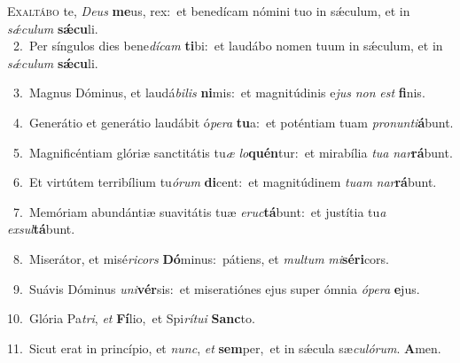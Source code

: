 \lettrine{\initial\textcolor{\initialcolor}{E}}{xaltábo} te, \textit{De}\-\textit{us} \textbf{me}\-us, rex:~\star et benedícam nómini tuo in sǽculum, et in \textit{sǽ}\-\textit{cu}\textit{lum} \textbf{sǽ}\-\textbf{cu}li.\\
{\numbfont\textcolor{\numbcolor}{~2.}}~Per síngulos dies bene\-\textit{dí}\-\textit{cam} \textbf{ti}\-bi:~\star et laudábo nomen tuum in sǽculum, et in \textit{sǽ}\-\textit{cu}\textit{lum} \textbf{sǽ}\-\textbf{cu}li.\par
{\numbfont\textcolor{\numbcolor}{~3.}}~Magnus Dóminus, et laudá\-\textit{bi}\-\textit{lis} \textbf{ni}\-mis:~\star et magnitúdinis e\textit{jus} \textit{non} \textit{est} \textbf{fi}\-nis.\par
{\numbfont\textcolor{\numbcolor}{~4.}}~Generátio et generátio laudábit ó\-\textit{pe}\-\textit{ra} \textbf{tu}\-a:~\star et poténtiam tuam \textit{pro}\-\textit{nun}\textit{ti}\textbf{á}bunt.\par
{\numbfont\textcolor{\numbcolor}{~5.}}~Magnificéntiam glóriæ sanctitátis tu\textit{æ} \textit{lo}\-\textbf{quén}tur:~\star et mirabília \textit{tu}\-\textit{a} \textit{nar}\-\textbf{rá}bunt.\par
{\numbfont\textcolor{\numbcolor}{~6.}}~Et virtútem terribílium tu\-\textit{ó}\-\textit{rum} \textbf{di}\-cent:~\star et magnitúdinem \textit{tu}\-\textit{am} \textit{nar}\-\textbf{rá}bunt.\par
{\numbfont\textcolor{\numbcolor}{~7.}}~Memóriam abundántiæ suavitátis tuæ \textit{e}\-\textit{ruc}\textbf{tá}bunt:~\star et justítia tu\textit{a} \textit{ex}\-\textit{sul}\textbf{tá}bunt.\par
{\numbfont\textcolor{\numbcolor}{~8.}}~Miserátor, et misé\-\textit{ri}\-\textit{cors} \textbf{Dó}\-minus:~\star pátiens, et \textit{mul}\-\textit{tum} \textit{mi}\-\textbf{sé}\textbf{ri}cors.\par
{\numbfont\textcolor{\numbcolor}{~9.}}~Suávis Dóminus \textit{u}\-\textit{ni}\textbf{vér}sis:~\star et miseratiónes ejus super ómnia \textit{ó}\-\textit{pe}\textit{ra} \textbf{e}\-jus.\par
{\numbfont\textcolor{\numbcolor}{10.}}~Glória Pa\-\textit{tri}\-, \textit{et} \textbf{Fí}\-lio,~\star et Spi\-\textit{rí}\-\textit{tu}\textit{i} \textbf{Sanc}\-to.\par
{\numbfont\textcolor{\numbcolor}{11.}}~Sicut erat in princípio, et \textit{nunc}\-, \textit{et} \textbf{sem}\-per,~\star et in sǽcula sæ\-\textit{cu}\-\textit{ló}\textit{rum}. \textbf{A}\-men.\par
